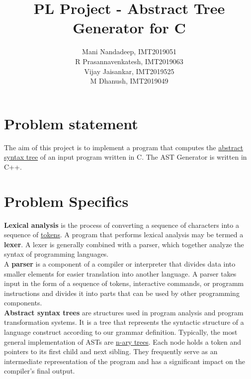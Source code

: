 \documentclass[journal,12pt]{IEEEtran}
\begin{document}
%
\title{PL Project - Abstract Tree Generator for C}
\author{Mani Nandadeep, IMT2019051 \\ R Prasannavenkatesh, IMT2019063 \\ Vijay Jaisankar, IMT2019525\\ M Dhanush, IMT2019049}
\maketitle




\section{Problem statement}
The aim of this project is to implement a program that computes the \href{https://en.wikipedia.org/wiki/Abstract_syntax_tree}{abstract syntax tree} of an input program written in C. The AST Generator is written in C++.


\vspace{15pt}

\section{Problem Specifics}
\textbf{Lexical analysis} is the process of converting a sequence of characters into a sequence of \href{https://codeforwin.org/2015/05/introduction-to-programming-tokens.html}{tokens}. A program that performs lexical analysis may be termed a \textbf{lexer}. A lexer is generally combined with a parser, which together analyze the syntax of programming languages. \\

A \textbf{parser} is a component of a compiler or interpreter that divides data into smaller elements for easier translation into another language.
A parser takes input in the form of a sequence of tokens, interactive commands, or programm instructions and divides it into parts that can be used by other programming components. \\ 

\textbf{Abstract syntax trees} are structures used in program analysis and program transformation systems. It is a tree that represents the syntactic structure of a language construct according to our grammar definition. Typically, the most general implementation of ASTs are \href{https://www.geeksforgeeks.org/generic-treesn-array-trees/}{n-ary trees}. Each node holds a token and pointers to its first child and next sibling. They frequently serve as an intermediate representation of the program and has a significant impact on the compiler's final output. \\
\end{document}
